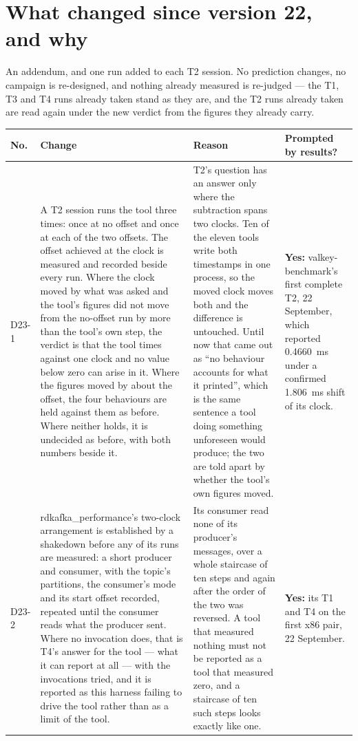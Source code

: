 \documentclass[11pt]{article}
\begin{document}
\section*{What changed since version 22, and why}
An addendum, and one run added to each T2 session. No prediction changes, no campaign is
re-designed, and nothing already measured is re-judged --- the T1, T3 and T4 runs already taken
stand as they are, and the T2 runs already taken are read again under the new verdict from the
figures they already carry.

{\small
\begin{longtable}{@{}p{1.1cm} >{\raggedright\arraybackslash}p{6.1cm} >{\raggedright\arraybackslash}p{6.0cm} >{\raggedright\arraybackslash}p{2.2cm}@{}}
\toprule
\textbf{No.} & \textbf{Change} & \textbf{Reason} & \textbf{Prompted by results?} \\
\midrule
\endhead
D23-1 & A T2 session runs the tool three times: once at no offset and once at each of the two
offsets. The offset achieved at the clock is measured and recorded beside every run. Where the
clock moved by what was asked and the tool's figures did not move from the no-offset run by more
than the tool's own step, the verdict is that the tool times against one clock and no value below
zero can arise in it. Where the figures moved by about the offset, the four behaviours are held
against them as before. Where neither holds, it is undecided as before, with both numbers
beside it. & T2's question has an answer only where the subtraction spans two clocks. Ten of the
eleven tools write both timestamps in one process, so the moved clock moves both and the
difference is untouched. Until now that came out as ``no behaviour accounts for what it
printed'', which is the same sentence a tool doing something unforeseen would produce; the two
are told apart by whether the tool's own figures moved. & \textbf{Yes:} valkey-benchmark's first
complete T2, 22 September, which reported 0.4660~ms under a confirmed 1.806~ms shift of its
clock. \\
D23-2 & rdkafka\_performance's two-clock arrangement is established by a shakedown before any of
its runs are measured: a short producer and consumer, with the topic's partitions, the consumer's
mode and its start offset recorded, repeated until the consumer reads what the producer sent.
Where no invocation does, that is T4's answer for the tool --- what it can report at all --- with
the invocations tried, and it is reported as this harness failing to drive the tool rather than
as a limit of the tool. & Its consumer read none of its producer's messages, over a whole
staircase of ten steps and again after the order of the two was reversed. A tool that measured
nothing must not be reported as a tool that measured zero, and a staircase of ten such steps
looks exactly like one. & \textbf{Yes:} its T1 and T4 on the first x86 pair, 22 September. \\
\bottomrule
\end{longtable}}
\end{document}
